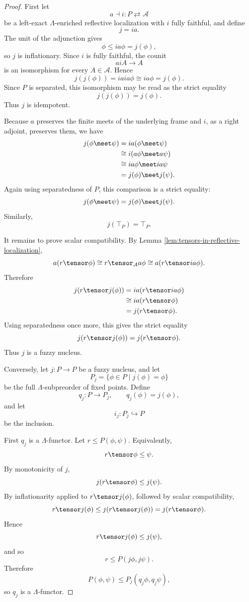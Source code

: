 \begin{proof}
First let
\[
    a\dashv i:
    P\rightleftarrows\mathcal A
\]
be a left-exact \(\Lambda\)-enriched reflective localization with \(i\) fully
faithful, and define
\[
    j=ia.
\]
The unit of the adjunction gives
\[
    \phi\leq ia\phi=j(\phi),
\]
so \(j\) is inflationary. Since \(i\) is fully faithful, the counit
\[
    aiA\to A
\]
is an isomorphism for every \(A\in\mathcal A\). Hence
\[
    j(j(\phi))
    =
    iaia\phi
    \cong
    ia\phi
    =
    j(\phi).
\]
Since \(P\) is separated, this isomorphism may be read as the strict equality
\[
    j(j(\phi))=j(\phi).
\]
Thus \(j\) is idempotent.

Because \(a\) preserves the finite meets of the underlying frame and \(i\), as a
right adjoint, preserves them, we have
\[
\begin{aligned}
j(\phi\meet\psi)
&=
ia(\phi\meet\psi)
\\
&\cong
i(a\phi\meet a\psi)
\\
&\cong
ia\phi\meet ia\psi
\\
&=
j(\phi)\meet j(\psi).
\end{aligned}
\]
Again using separatedness of \(P\), this comparison is a strict equality:
\[
    j(\phi\meet\psi)=j(\phi)\meet j(\psi).
\]
Similarly,
\[
    j(\top_P)=\top_P.
\]

It remains to prove scalar compatibility. By Lemma
\ref{lem:tensors-in-reflective-localization},
\[
    a(r\tensor\phi)
    \cong
    r\tensor_{\mathcal A}a\phi
    \cong
    a(r\tensor ia\phi).
\]
Therefore
\[
\begin{aligned}
j(r\tensor j(\phi))
&=
ia(r\tensor ia\phi)
\\
&\cong
ia(r\tensor\phi)
\\
&=
j(r\tensor\phi).
\end{aligned}
\]
Using separatedness once more, this gives the strict equality
\[
    j(r\tensor j(\phi))=j(r\tensor\phi).
\]
Thus \(j\) is a fuzzy nucleus.

Conversely, let \(j:P\to P\) be a fuzzy nucleus, and let
\[
    P_j=\{\phi\in P\mid j(\phi)=\phi\}
\]
be the full \(\Lambda\)-subpreorder of fixed points. Define
\[
    q_j:P\to P_j,
    \qquad
    q_j(\phi)=j(\phi),
\]
and let
\[
    i_j:P_j\hookrightarrow P
\]
be the inclusion.

First \(q_j\) is a \(\Lambda\)-functor. Let \(r\leq P(\phi,\psi)\). Equivalently,
\[
    r\tensor\phi\leq\psi.
\]
By monotonicity of \(j\),
\[
    j(r\tensor\phi)\leq j(\psi).
\]
By inflationarity applied to \(r\tensor j(\phi)\), followed by scalar compatibility,
\[
    r\tensor j(\phi)
    \leq
    j(r\tensor j(\phi))
    =
    j(r\tensor\phi).
\]
Hence
\[
    r\tensor j(\phi)\leq j(\psi),
\]
and so
\[
    r\leq P(j\phi,j\psi).
\]
Therefore
\[
    P(\phi,\psi)\leq P_j(q_j\phi,q_j\psi),
\]
so \(q_j\) is a \(\Lambda\)-functor.


\end{proof}
